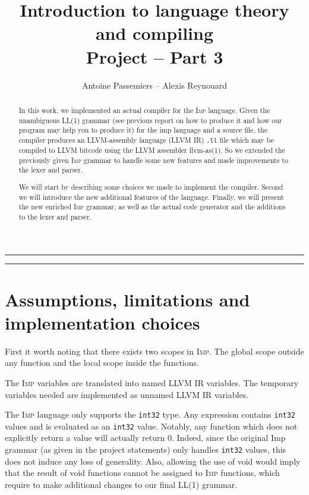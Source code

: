 \documentclass[11pt]{article}
\title{Introduction to language theory and compiling \\ Project -- Part 3}
\author{Antoine Passemiers -- Alexis Reynouard}
\newcommand\imp{\textsc{Imp}\xspace}
\newcommand\inttt{\texttt{int32}\xspace}
\begin{document}
\maketitle
\thispagestyle{empty}

\vfil
\begin{abstract}
In this work, we implemented an actual compiler for the \imp language.
Given the unambiguous LL(1) grammar (see previous report on how to produce it and how our program may help you
to produce it) for the imp language and a source file, 
the compiler produces an LLVM-assembly language (LLVM IR) \texttt{.ll} file which may be
compiled to LLVM bitcode using the LLVM assembler \textsf{llvm-as(1)}.
So we extended the previously given \imp grammar to handle some new features
and made improvements to the lexer and parser.

We will start by describing some choices we made to implement the compiler.
Second we will introduce the new additional features of the language.
Finally, we will present the new enriched \imp grammar,
as well as the actual code generator and the additions to the lexer and parser.
\end{abstract}

\clearpage
\vfill
\hrule
\vspace{\baselineskip}
\tableofcontents
\vspace{3\baselineskip}
\hrule
\vfill
\clearpage

\setcounter{page}{1}

\section{Assumptions, limitations and implementation choices}

First it worth noting that there exists two scopes in \imp.
The global scope outside any function and the local scope inside the functions.

The \imp variables are translated into named LLVM IR variables.
The temporary variables needed are implemented as unnamed LLVM IR variables.

The \imp language only supports the \inttt type.
Any expression contains \inttt values and is evaluated as an \inttt value.
Notably, any function which does not explicitly return a value will actually return 0.
Indeed, since the original Imp grammar (as given in the project statements) only handles
\inttt values, this does not induce any loss of generality. Also, allowing the use
of void would imply that the result of void functions cannot be assigned to \imp functions,
which require to make additional changes to our final LL(1) grammar.
\end{document}
